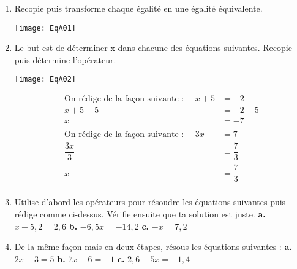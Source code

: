  
\begin{activite}
\begin{enumerate}
\item Recopie puis transforme chaque égalité en une égalité équivalente.

\vspace{1em}

\texttt{[image: EqA01]}

\vspace{1em}


\newpage

\item  Le but est de déterminer x dans chacune des équations suivantes. Recopie puis détermine l'opérateur.

\begin{minipage}[c]{.48\linewidth}
\texttt{[image: EqA02]}
\end{minipage}%
\hfill%
\begin{minipage}[c]{.48\linewidth}
\begin{align*}
\text{On rédige de la façon suivante : } \quad      x + 5 &= -2 \\
                                                x + 5 - 5 &= -2 - 5 \\
                                                        x &= -7 \\
& \\
\text{On rédige de la façon suivante : }  \quad         3x &= 7 \\
                                                    \dfrac{3x}{3}&= \dfrac{7}{3} \\
                                                    x &= \dfrac{7}{3}\\
\end{align*}
\end{minipage}

\item Utilise d'abord les opérateurs pour résoudre les équations suivantes puis rédige comme ci-dessus. Vérifie ensuite que ta solution est juste. 
    \subitem \textbf{a.} $x - 5,2 = 2,6$
    \subitem \textbf{b.} $-6,5x = -14,2$
    \subitem \textbf{c.} $-x = 7,2$
\item De la même façon mais en deux étapes, résous les équations suivantes : 
    \subitem \textbf{a.} $2x + 3 = 5$
    \subitem \textbf{b.} $7x - 6 = -1$
    \subitem \textbf{c.} $2,6 - 5x = -1,4$
\end{enumerate}
\end{activite}
    
